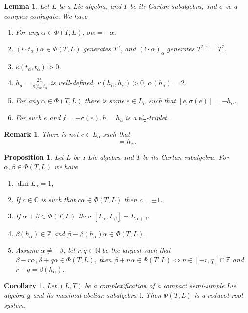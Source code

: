 \documentclass{article}
\newtheorem{proposition}{Proposition}[section]
\newtheorem{lemma}{Lemma}[section]
\newtheorem{remark}{Remark}[section]
\newtheorem{corollary}{Corollary}[section]
\numberwithin{equation}{section}
\begin{document}
\begin{lemma}
Let $L$ be a Lie algebra, and $T$ be its Cartan subalgebra, and $\sigma$ be a complex conjugate. We have
\begin{enumerate}
\item For any $\alpha\in\Phi(T,L)$, $\sigma\alpha=-\alpha$.
\item $(i\cdot t_\alpha)\alpha\in\Phi(T,L)$ generates $T^\sigma$, and $(i\cdot\alpha)_\alpha$ generates $T^{*,\sigma} = T^*$.
\item $\kappa(t_\alpha,t_\alpha)>0$.
\item $h_\alpha = {\frac {2t_\alpha} {\kappa(t_\alpha,t_\alpha}}$ is well-defined, $\kappa(h_\alpha,h_\alpha)>0$, $\alpha(h_\alpha)=2$.
\item For any $\alpha\in\Phi(T,L)$ there is some $e\in L_\alpha$ such that $[e,\sigma(e)]=-h_{\alpha}$.
\item For such $e$ and $f=-\sigma(e),h=h_\alpha$ is a $\mathfrak{sl}_2$-triplet.
\end{enumerate}
\end{lemma}

\begin{remark}
There is not $e\in L_\alpha$ such that
\begin{equation*}
[e,\sigma(e)] = h_\alpha.
\end{equation*}
\end{remark}

\begin{proposition}
Let $L$ be a Lie algebra and $T$ be its Cartan subalgebra. For $\alpha,\beta\in\Phi(T,L)$ we have
\begin{enumerate}
\item $\dim L_\alpha = 1$,
\item If $c\in\mathbb{C}$ is such that $c\alpha\in \Phi(T,L)$ then $c=\pm1$.
\item If $\alpha+\beta\in\Phi(T,L)$ then $[L_\alpha,L_\beta] = L_{\alpha+\beta}$.
\item $\beta(h_\alpha)\in\mathbb{Z}$ and $\beta-\beta(h_\alpha)\alpha\in\Phi(T,L)$.
\item Assume $\alpha\not=\pm\beta$, let $r,q\in\mathbb{N}$ be the largest such that $\beta-r\alpha,\beta+q\alpha\in\Phi(T,L)$, then $\beta+n\alpha\in\Phi(T,L)\Leftrightarrow n\in[-r,q]\cap\mathbb{Z}$ and $r-q = \beta(h_\alpha)$.
\end{enumerate}
\end{proposition}

\begin{corollary}
Let $(L,T)$ be a complexification of a compact semi-simple Lie algebra $\mathfrak{g}$ and its maximal abelian subalgebra $\mathfrak{t}$. Then $\Phi(T,L)$ is a reduced root system.
\end{corollary}
\end{document}
